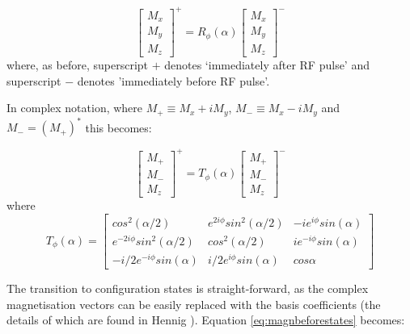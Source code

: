 \begin{equation}
    \begin{bmatrix} 
    M_x \\
    M_y \\
    M_z
    \end{bmatrix}^+ = 
        R_{\phi}(\alpha)
    \begin{bmatrix} 
    M_x \\
    M_y \\
    M_z
    \end{bmatrix}^-
\end{equation}
where, as before, superscript $+$ denotes `immediately after RF pulse' and superscript $-$ denotes 'immediately before RF pulse'.

\hfill

In complex notation, where $M_+ \equiv M_x + i M_y$,  $M_- \equiv M_x - i M_y$ and $M_- = (M_+)^*$ this becomes:

\begin{equation}\label{eq:magnbeforestates}
    \begin{bmatrix} 
    M_+ \\
    M_- \\
    M_z
    \end{bmatrix}^+ = 
        T_{\phi}(\alpha)
    \begin{bmatrix} 
    M_+ \\
    M_- \\
    M_z
    \end{bmatrix}^-
\end{equation}
where 
\begin{equation}\label{eq:woessnerFn2}
    T_{\phi}(\alpha) = 
    \begin{bmatrix}
        cos^2(\alpha/2) & e^{2i\phi} sin^2(\alpha/2) & - i e^{i \phi} sin(\alpha) \\
        e^{-2i\phi} sin^2(\alpha/2) & cos^2(\alpha/2) & i e^{-i \phi} sin(\alpha) \\
        - i/2 e^{-i \phi} sin(\alpha) & i/2 e^{i \phi} sin(\alpha) & cos \alpha
    \end{bmatrix}
\end{equation}

\hfill


The transition to configuration states is straight-forward, as the complex magnetisation vectors can be easily replaced with the basis coefficients (the details of which are found in Hennig \cite{Hennig1991}).
Equation \ref{eq:magnbeforestates} becomes:

